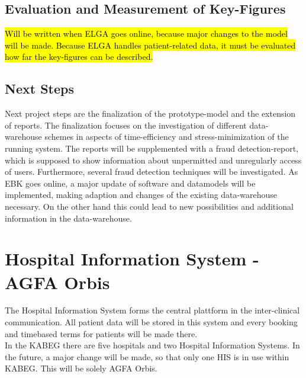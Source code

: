 \documentclass[a4paper]{article}
\begin{document}
	\subsection{Evaluation and Measurement of Key-Figures}
	\hl{Will be written when ELGA goes online, because major changes to the model
	will be made.
	Because ELGA handles patient-related data, it must be evaluated how far the
	key-figures can be described.}
	\subsection{Next Steps}
	Next project steps are the finalization of the prototype-model and the
	extension of reports. The finalization focuses on the investigation of
	different data-warehouse schemes in aspects of time-efficiency and stress-minimization of the running system.
	The reports will be supplemented with a fraud detection-report, which is supposed to 
	show information about unpermitted and unregularly access of users.
	Furthermore, several fraud detection techniques will be investigated. As EBK goes online, a major
	update of software and datamodels will be implemented, making adaption and
	changes of the existing data-warehouse necessary. On the other hand this could
	lead to new possibilities and additional information in the data-warehouse.
	
	\newpage
	
	\section{Hospital Information System - AGFA Orbis}
	The Hospital Information System forms the central plattform in
	the inter-clinical communication. All patient data will be stored in this
	system and every booking and timebased terms for patients will be made there.\\
	In the KABEG there are five hospitals and two Hospital Information
	Systems. In the future, a major change will be made, so that only one
	HIS is in use within KABEG. This will be solely AGFA Orbis.
\end{document}
